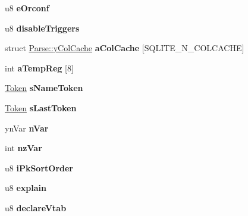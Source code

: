 \begin{DoxyCompactItemize}
\item 
u8 {\bfseries e\+Orconf}\hypertarget{structParse_a67083fd2286b7d5276831e84a1a16680}{}\label{structParse_a67083fd2286b7d5276831e84a1a16680}

\item 
u8 {\bfseries disable\+Triggers}\hypertarget{structParse_a5ea9b658f4cfacf4b35f18c51e144ef1}{}\label{structParse_a5ea9b658f4cfacf4b35f18c51e144ef1}

\item 
struct \hyperlink{structParse_1_1yColCache}{Parse\+::y\+Col\+Cache} {\bfseries a\+Col\+Cache} \mbox{[}S\+Q\+L\+I\+T\+E\+\_\+\+N\+\_\+\+C\+O\+L\+C\+A\+C\+HE\mbox{]}\hypertarget{structParse_a788b85979d58b84e06bc367bac5b3f3f}{}\label{structParse_a788b85979d58b84e06bc367bac5b3f3f}

\item 
int {\bfseries a\+Temp\+Reg} \mbox{[}8\mbox{]}\hypertarget{structParse_ae2bd2e74d0caaab7a741d17b62f01ebc}{}\label{structParse_ae2bd2e74d0caaab7a741d17b62f01ebc}

\item 
\hyperlink{structToken}{Token} {\bfseries s\+Name\+Token}\hypertarget{structParse_afd929c54566cfc4d6f748fcc6b79b973}{}\label{structParse_afd929c54566cfc4d6f748fcc6b79b973}

\item 
\hyperlink{structToken}{Token} {\bfseries s\+Last\+Token}\hypertarget{structParse_ad499020d1bf06f3c98c8d36e2ceb83fd}{}\label{structParse_ad499020d1bf06f3c98c8d36e2ceb83fd}

\item 
yn\+Var {\bfseries n\+Var}\hypertarget{structParse_ae529f84d792c36e3f474e2ff89f0b6e4}{}\label{structParse_ae529f84d792c36e3f474e2ff89f0b6e4}

\item 
int {\bfseries nz\+Var}\hypertarget{structParse_ac9cf894d9dfd0ba37d9467cd9d2e48f0}{}\label{structParse_ac9cf894d9dfd0ba37d9467cd9d2e48f0}

\item 
u8 {\bfseries i\+Pk\+Sort\+Order}\hypertarget{structParse_a2be71f432ab79d2db44f1fcbbce55488}{}\label{structParse_a2be71f432ab79d2db44f1fcbbce55488}

\item 
u8 {\bfseries explain}\hypertarget{structParse_a41f7ea55f0d6523295a5d958e25a2787}{}\label{structParse_a41f7ea55f0d6523295a5d958e25a2787}

\item 
u8 {\bfseries declare\+Vtab}\hypertarget{structParse_a86c869df65cd788025680de9b6a9b1f1}{}\label{structParse_a86c869df65cd788025680de9b6a9b1f1}


\end{DoxyCompactItemize}
